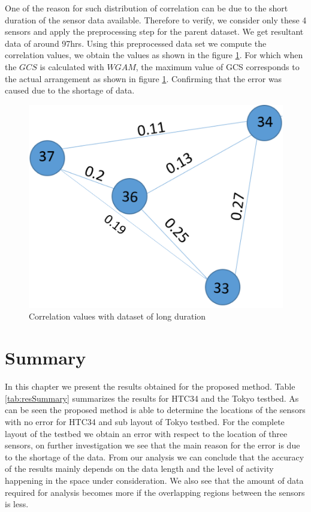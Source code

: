One of the reason for such distribution of correlation can be due to the short duration of the sensor data available. Therefore to verify, we consider only these 4 sensors and apply the preprocessing step for the parent dataset. We get resultant data of around 97hrs. Using this preprocessed data set we compute the correlation values, we obtain the values as shown in the figure \ref{fig:arr}. For which when the $GCS$ is calculated with $WGAM$, the maximum value of GCS corresponds to the actual arrangement as shown in figure \ref{fig:arr}. Confirming that the error was caused due to the shortage of data.

\begin{figure}
\includegraphics[scale=0.4]{./pics/long_data_arr.png}
\caption{Correlation values with dataset of long duration}
\label{fig:arr}
\end{figure}
\section{Summary}

In this chapter we present the results obtained for the proposed method. Table \ref{tab:resSummary} summarizes the results for HTC34 and the Tokyo testbed. As can be seen the proposed method is able to determine the locations of the sensors with no error for HTC34 and sub layout of Tokyo testbed. For the complete layout of the testbed we obtain an error with respect to the location of three sensors, on further investigation we see that the main reason for the error is due to the shortage of the data. From our analysis we can conclude that the accuracy of the results mainly depends on the data length and the level of activity happening in the space under consideration. We also see that the amount of data required for analysis becomes more if the overlapping regions between the sensors is less.

